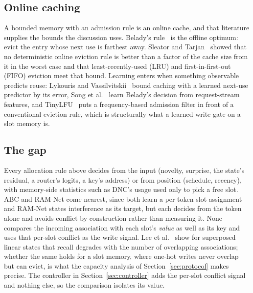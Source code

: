\documentclass[conference]{IEEEtran}
\begin{document}
\subsection{Online caching}
\label{sec:caching-rw}

A bounded memory with an admission rule is an online cache, and that
literature supplies the bounds the discussion uses. Belady's
rule~\cite{belady1966study} is the offline optimum: evict the entry whose next
use is farthest away. Sleator and Tarjan~\cite{sleator1985amortized} showed
that no deterministic online eviction rule is better than a factor of the
cache size from it in the worst case and that least-recently-used (LRU) and
first-in-first-out (FIFO) eviction meet that bound.
Learning enters when something observable predicts reuse: Lykouris and
Vassilvitskii~\cite{lykouris2018competitive} bound caching with a learned
next-use predictor by its error, Song et al.~\cite{song2020lrb} learn
Belady's decision from request-stream features, and
TinyLFU~\cite{einziger2017tinylfu} puts a frequency-based admission filter in
front of a conventional eviction rule, which is structurally what a learned
write gate on a slot memory is.

\subsection{The gap}

Every allocation rule above decides from the input (novelty, surprise, the
state's residual, a router's logits, a key's address) or from position
(schedule, recency), with memory-side statistics such as DNC's usage used only
to pick a free slot. ABC and RAM-Net come nearest, since both learn a per-token
slot assignment and RAM-Net states interference as its target, but each
decides from the token alone and avoids conflict by construction rather than
measuring it. None compares the incoming association with each slot's
\emph{value} as well as its key and uses that per-slot conflict as the write
signal. Lee et al.~\cite{lee2026howlinear} show for superposed linear states
that recall degrades with the number of overlapping associations; whether the
same holds for a slot memory, where one-hot writes never overlap but can
evict, is what the capacity analysis of Section~\ref{sec:protocol} makes
precise. The controller in Section~\ref{sec:controller} adds the per-slot
conflict signal and nothing else, so the comparison isolates its value.

\end{document}
